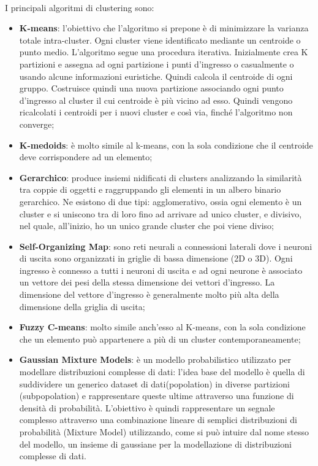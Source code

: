 \\
I principali algoritmi di clustering sono:
\begin{itemize}
	\item \textbf{K-means}: l'obiettivo che l'algoritmo si prepone è di minimizzare la varianza totale intra-cluster. Ogni cluster viene identificato mediante un centroide o punto medio. L'algoritmo segue una procedura iterativa. Inizialmente crea K partizioni e assegna ad ogni partizione i punti d'ingresso o casualmente o usando alcune informazioni euristiche. Quindi calcola il centroide di ogni gruppo. Costruisce quindi una nuova partizione associando ogni punto d'ingresso al cluster il cui centroide è più vicino ad esso. Quindi vengono ricalcolati i centroidi per i nuovi cluster e così via, finché l'algoritmo non converge;
	\item \textbf{K-medoids}: è molto simile al k-means, con la sola condizione che il centroide deve corrispondere ad un elemento;
	\item \textbf{Gerarchico}: produce insiemi nidificati di clusters analizzando la similarità tra coppie di oggetti e raggruppando gli elementi in un albero binario gerarchico. Ne esistono di due tipi: agglomerativo, ossia ogni elemento è un cluster e si uniscono tra di loro fino ad arrivare ad unico cluster, e divisivo, nel quale, all'inizio, ho un unico grande cluster che poi viene diviso;
	\item \textbf{Self-Organizing Map}: sono reti neurali a connessioni laterali dove i neuroni di uscita sono organizzati in griglie di bassa dimensione (2D o 3D). Ogni ingresso è connesso a tutti i neuroni di uscita e ad ogni neurone è associato un vettore dei pesi della stessa dimensione dei vettori d'ingresso. La dimensione del vettore d'ingresso è generalmente molto più alta della dimensione della griglia di uscita;
	\item \textbf{Fuzzy C-means}: molto simile anch'esso al K-means, con la sola condizione che un elemento può appartenere a più di un cluster contemporaneamente;
	\item \textbf{Gaussian Mixture Models}: è un modello probabilistico utilizzato per modellare distribuzioni complesse di dati: l’idea base del modello è quella di suddividere un generico dataset di dati(popolation) in diverse partizioni (subpopolation) e rappresentare queste ultime attraverso una funzione di densità di probabilità. L’obiettivo è quindi rappresentare un segnale complesso attraverso una combinazione lineare di semplici distribuzioni di probabilità (Mixture Model) utilizzando, come si può intuire dal nome stesso del modello, un insieme di gaussiane per la modellazione di distribuzioni complesse di dati.
\end{itemize}
